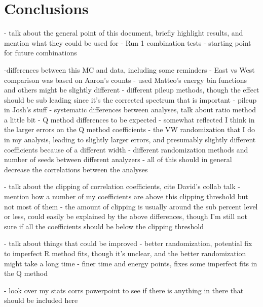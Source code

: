 
\graphicspath{{Body/Figures/}}

\clearpage
\section{Conclusions}

- talk about the general point of this document, briefly highlight results, and mention what they could be used for
	- Run 1 combination tests
	- starting point for future combinations

	


-differences between this MC and data, including some reminders
 - East vs West comparison was based on Aaron's counts
 - used Matteo's energy bin functions and others might be slightly different
 - different pileup methods, though the effect should be sub leading since it's the corrected spectrum that is important
 - pileup in Josh's stuff
 - systematic differences between analyses, talk about ratio method a little bit
 - Q method differences to be expected - somewhat reflected I think in the larger errors on the Q method coefficients
 - the VW randomization that I do in my analysis, leading to slightly larger errors, and presumably slightly different coefficients because of a different width
 - different randomization methods and number of seeds between different analyzers
- all of this should in general decrease the correlations between the analyses

- talk about the clipping of correlation coefficients, cite David's collab talk
	- mention how a number of my coefficients are above this clipping threshold but not most of them
	- the amount of clipping is usually around the sub percent level or less, could easily be explained by the above differences, though I'm still not sure if all the coefficients should be below the clipping threshold


- talk about things that could be improved
	- better randomization, potential fix to imperfect R method fits, though it's unclear, and the better randomization might take a long time
	- finer time and energy points, fixes some imperfect fits in the Q method


- look over my stats corrs powerpoint to see if there is anything in there that should be included here


